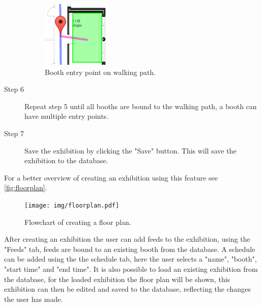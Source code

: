 \begin{description}
\begin{figure}[H]
		\includegraphics[width=\linewidth]{img/website/step5.png}
		\caption{Booth entry point on walking path.\label{fig:websitestep5}}
	\end{figure}
	\item[Step 6] Repeat step 5 until all booths are bound to the walking path, a booth can have multiple entry points.
	\item[Step 7] Save the exhibition by clicking the "Save" button. This will save the exhibition to the database.
\end{description}
For a better overview of creating an exhibition using this feature see \autoref{fig:floorplan}.
\begin{figure}[H]
	\centering
	\texttt{[image: img/floorplan.pdf]}
	\caption{Flowchart of creating a floor plan.\label{fig:floorplan}}
\end{figure}


After creating an exhibition the user can add feeds to the exhibition, using the "Feeds" tab, feeds are bound to an existing booth from the database. A schedule can be added using the the schedule tab, here the user selects a "name", "booth", "start time" and "end time".
It is also possible to load an existing exhibition from the database, for the loaded exhibition the floor plan will be shown, this exhibition can then be edited and saved to the database, reflecting the changes the user has made.


